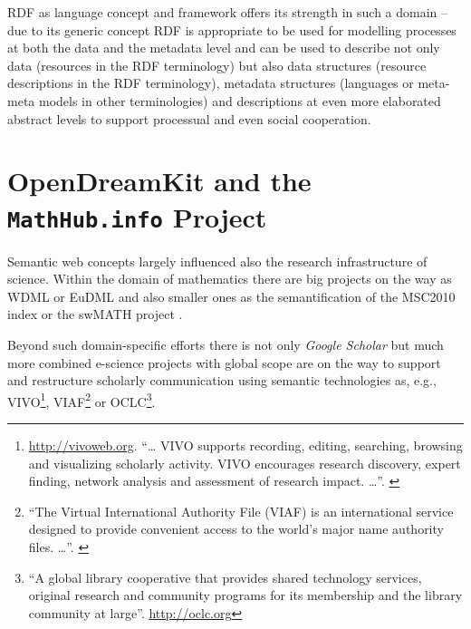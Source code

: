 \documentclass{llncs}
\begin{document}
RDF as language concept and framework offers its strength in such a domain --
due to its generic concept RDF is appropriate to be used for modelling
processes at both the data and the metadata level and can be used to describe
not only data (resources in the RDF terminology) but also data structures
(resource descriptions in the RDF terminology), metadata structures (languages
or meta-meta models in other terminologies) and descriptions at even more
elaborated abstract levels to support processual and even social cooperation.

\section{OpenDreamKit and the \texttt{MathHub.info} Project}

Semantic web concepts largely influenced also the research infrastructure of
science.  Within the domain of mathematics there are big projects on the way as
WDML \cite{PitmannLynch,WDML} or EuDML \cite{EuDML} and also smaller ones as
the semantification of the MSC2010 index \cite{MSC2010} or the swMATH project
\cite{swmath}.

Beyond such domain-specific efforts there is not only \emph{Google Scholar} but
much more combined e-science projects with global scope are on the way to
support and restructure scholarly communication using semantic technologies as,
e.g., VIVO\footnote{\url{http://vivoweb.org}. ``{\ldots} VIVO supports
  recording, editing, searching, browsing and visualizing scholarly
  activity. VIVO encourages research discovery, expert finding, network
  analysis and assessment of research impact.  {\ldots}''. \cite{vivo}},
VIAF\footnote{``The Virtual International Authority File (VIAF) is an
  international service designed to provide convenient access to the world's
  major name authority files.  {\ldots}''. \cite{viaf}} or OCLC\footnote{``A
  global library cooperative that provides shared technology services, original
  research and community programs for its membership and the library community
  at large''.  \url{http://oclc.org}}.
\end{document}
